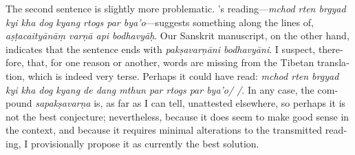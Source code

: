 \documentclass[naipra.tex]{subfiles}
\begin{document}
\begin{sanskrit}
{\begin{english}
	The second sentence is slightly more problematic. \TIB 's reading—\emph{mchod rten brgyad kyi kha dog kyang rtogs par bya'o}—suggests something along the lines of, \emph{aṣṭacaityānāṃ varṇā api bodhavyāḥ}.
	Our Sanskrit manuscript, on the other hand, indicates that the sentence ends with \emph{pakṣavarṇāni bodhavyāni}.
	I suspect, therefore, that, for one reason or another, words are missing from the Tibetan translation, which is indeed very terse.
	Perhaps it could have read: \emph{mchod rten brgyad kyi kha dog kyang de dang mthun par rtogs par bya'o/ /}.
	In any case, the compound \emph{sapakṣavarṇa} is, as far as I can tell, unattested elsewhere, so perhaps it is not the best conjecture; nevertheless, because it does seem to make good sense in the context, and because it requires minimal alterations to the transmitted reading, I provisionally propose it as currently the best solution. 
\end{english}}
\pend



\end{sanskrit}
\end{document}
